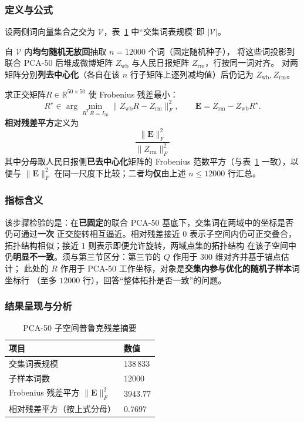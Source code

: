 \documentclass[withoutpreface]{cumcmthesis}
\begin{document}
\subsubsection{定义与公式}

设两侧词向量集合之交为 $\mathcal{V}$，表~\ref{tab:geom-proc} 中“交集词表规模”即 $|\mathcal{V}|$。

自 $\mathcal{V}$ 内\textbf{均匀随机无放回}抽取 $n{=}12000$ 个词（固定随机种子），
将这些词投影到联合 PCA-50 后堆成微博矩阵 $Z_{\mathrm{wb}}$ 与人民日报矩阵 $Z_{\mathrm{rm}}$，行按同一词对齐。
对两矩阵分别\textbf{列去中心化}（各自在该 $n$ 行子矩阵上逐列减均值）后仍记为 $Z_{\mathrm{wb}},Z_{\mathrm{rm}}$。

求正交矩阵$R\in\mathbb{R}^{50\times 50}$ 使 Frobenius 残差最小：
\begin{equation}
  R^\star \in \arg\min_{R^{\mathsf{T}}R=I_{50}} \bigl\lVert Z_{\mathrm{wb}}R-Z_{\mathrm{rm}}\bigr\rVert_F^2,\qquad
  \mathbf{E}=Z_{\mathrm{rm}}-Z_{\mathrm{wb}}R^\star .
\end{equation}
\textbf{相对残差平方}定义为 
\begin{equation}
  \frac{\lVert\mathbf{E}\rVert_F^2}{\lVert Z_{\mathrm{rm}}\rVert_F^2}
\end{equation}
其中分母取人民日报侧\textbf{已去中心化}矩阵的 Frobenius 范数平方（与表~\ref{tab:geom-proc} 一致），以便与
$\lVert\mathbf{E}\rVert_F^2$ 在同一尺度下比较；二者均\textbf{仅}由上述 $n\le12000$ 行汇总。

\subsubsection{指标含义}
该步骤检验的是：在\textbf{已固定}的联合 PCA-50 基底下，交集词在两域中的坐标是否仍可通过\textbf{一次}
正交旋转相互逼近。相对残差接近 $0$ 表示子空间内仍可正交叠合，拓扑结构相似；接近 $1$ 则表示即便允许旋转，两域点集的拓扑结构
在该子空间中仍\textbf{明显不一致}。须与第三节区分：第三节的 $Q$ 作用于 $300$ 维对齐并基于锚点估计；
此处的 $R$ 作用于 PCA-50 工作坐标，对象是\textbf{交集内参与优化的随机子样本}词坐标行
（至多 $12000$ 行），回答“整体拓扑是否一致”的问题。

\subsubsection{结果呈现与分析}

\begin{table}[htbp]
  \centering
  \caption{PCA-50 子空间普鲁克残差摘要}
  \label{tab:geom-proc}
  \begin{tabular}{@{}ll@{}}
    \toprule
    项目 & 数值 \\
    \midrule
    交集词表规模 & $138\,833$ \\
    子样本词数 & $12000$ \\
    Frobenius 残差平方 $\lVert\mathbf{E}\rVert_F^2$ & $3943.77$ \\
    相对残差平方（按上式分母） & $0.7697$ \\
    \bottomrule
  \end{tabular}
\end{table}
\end{document}
